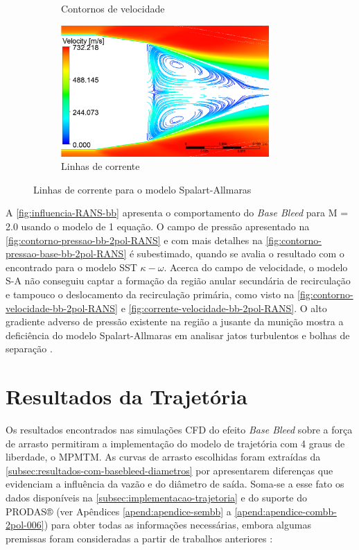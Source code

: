 \begin{figure}[!htpb]
\begin{subfigure}[b]{0.47\textwidth}
        \caption{Contornos de velocidade}
        \label{fig:contorno-velocidade-bb-2pol-RANS}
    \end{subfigure}
    \hfill
    \begin{subfigure}[b]{0.47\textwidth}
        \centering
        \includegraphics[height=5cm,width=\textwidth]{corrente-velocidade-SPALART-2pol.png}
        \caption{Linhas de corrente}
        \label{fig:corrente-velocidade-bb-2pol-RANS}
    \end{subfigure} 	
 	\caption{Linhas de corrente para o modelo Spalart-Allmaras}
    \label{fig:influencia-RANS-bb}
\end{figure}

A \autoref{fig:influencia-RANS-bb} apresenta o comportamento do \textit{Base Bleed} para M = \num{2,0} usando o modelo de 1 equação. O campo de pressão apresentado na \autoref{fig:contorno-pressao-bb-2pol-RANS} e com mais detalhes na \autoref{fig:contorno-pressao-base-bb-2pol-RANS} é subestimado, quando se avalia o resultado com o encontrado para o modelo SST \(\kappa-\omega\). Acerca do campo de velocidade, o modelo S-A não conseguiu captar a formação da região anular secundária de recirculação e tampouco o deslocamento da recirculação primária, como visto na \autoref{fig:contorno-velocidade-bb-2pol-RANS} e \autoref{fig:corrente-velocidade-bb-2pol-RANS}. O alto gradiente adverso de pressão existente na região a jusante da munição mostra a deficiência do modelo Spalart-Allmaras em analisar jatos turbulentos e bolhas de separação \cite{Wilcox2006}. 

\section{Resultados da Trajetória}\label{sec:resultados-trajetoria}

Os resultados encontrados nas simulações CFD do efeito \textit{Base Bleed} sobre a força de arrasto permitiram a implementação do modelo de trajetória com 4 graus de liberdade, o MPMTM. As curvas de arrasto escolhidas foram extraídas da \autoref{subsec:resultados-com-basebleed-diametros} por apresentarem diferenças que evidenciam a influência da vazão e do diâmetro de saída. Soma-se a esse fato os dados disponíveis na \autoref{subsec:implementacao-trajetoria} e do suporte do PRODAS® (ver Apêndices \ref{apend:apendice-sembb} a \ref{apend:apendice-combb-2pol-006}) para obter todas as informações necessárias, embora algumas premissas foram consideradas a partir de trabalhos anteriores \cite{Rosendo2020,ThallyoENCIT2022,DAVENAS1993329,RosendoCILAMCE2022}:

